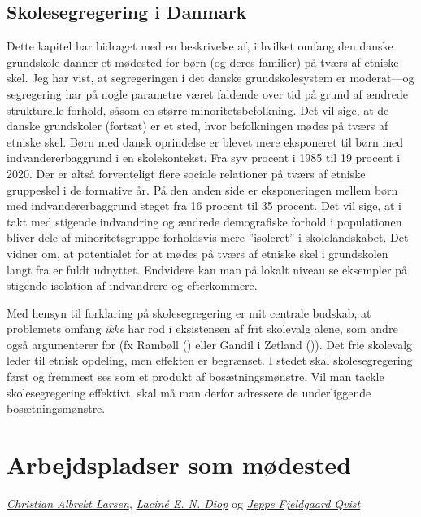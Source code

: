 \documentclass[
]{book}
\begin{document}
\section{Skolesegregering i Danmark}\label{skolesegregering-i-danmark}

Dette kapitel har bidraget med en beskrivelse af, i hvilket omfang den danske grundskole danner et mødested for børn (og deres familier) på tværs af etniske skel. Jeg har vist, at segregeringen i det danske grundskolesystem er moderat---og segregering har på nogle parametre været faldende over tid på grund af ændrede strukturelle forhold, såsom en større minoritetsbefolkning. Det vil sige, at de danske grundskoler (fortsat) er et sted, hvor befolkningen mødes på tværs af etniske skel. Børn med dansk oprindelse er blevet mere eksponeret til børn med indvandererbaggrund i en skolekontekst. Fra syv procent i 1985 til 19 procent i 2020. Der er altså forventeligt flere sociale relationer på tværs af etniske gruppeskel i de formative år. På den anden side er eksponeringen mellem børn med indvandererbaggrund steget fra 16 procent til 35 procent. Det vil sige, at i takt med stigende indvandring og ændrede demografiske forhold i populationen bliver dele af minoritetsgruppe forholdsvis mere ''isoleret'' i skolelandskabet. Det vidner om, at potentialet for at mødes på tværs af etniske skel i grundskolen langt fra er fuldt udnyttet. Endvidere kan man på lokalt niveau se eksempler på stigende isolation af indvandrere og efterkommere.

Med hensyn til forklaring på skolesegregering er mit centrale budskab, at problemets omfang \emph{ikke} har rod i eksistensen af frit skolevalg alene, som andre også argumenterer for (fx Rambøll () eller Gandil i Zetland ()). Det frie skolevalg leder til etnisk opdeling, men effekten er begrænset. I stedet skal skolesegregering først og fremmest ses som et produkt af bosætningsmønstre. Vil man tackle skolesegregering effektivt, skal må man derfor adressere de underliggende bosætningsmønstre.

\chapter{Arbejdspladser som mødested}\label{kap5}

\thispagestyle{empty}

\emph{\href{https://vbn.aau.dk/en/persons/albrekt}{Christian Albrekt Larsen}}, \emph{\href{https://vbn.aau.dk/en/persons/led}{Laciné E. N. Diop}} og \emph{\href{https://vbn.aau.dk/da/persons/jeppefl}{Jeppe Fjeldgaard Qvist}}
\end{document}
